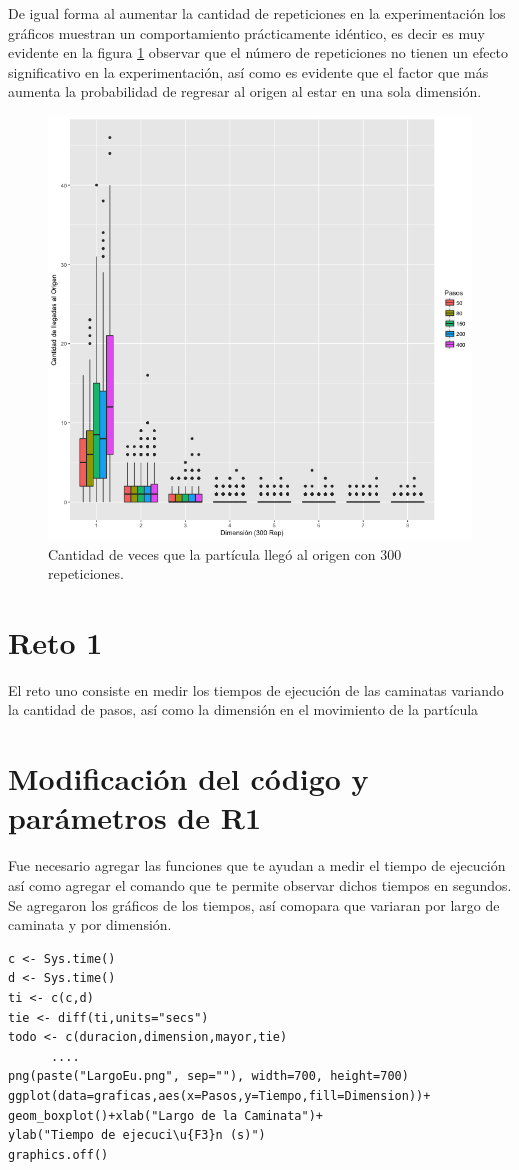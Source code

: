 \documentclass[a4paper]{article}
\begin{document}
De igual forma al aumentar la cantidad de repeticiones en la experimentación los gráficos muestran un comportamiento prácticamente idéntico, es decir es muy evidente en la figura \ref{fig:PorcentajesEu300} observar que el número de repeticiones no tienen un efecto significativo en la experimentación, así como es evidente que el factor que más aumenta la probabilidad de regresar al origen al estar en una sola dimensión.
\begin{figure}[h]
\centering
\includegraphics[width=0.7\linewidth]{PorcentajesEu300}
\caption{Cantidad de veces que la partícula llegó al origen con 300 repeticiones.}
\label{fig:PorcentajesEu300}
\end{figure}

\section{Reto 1}
El reto uno consiste en medir los tiempos de ejecución de las caminatas variando la cantidad de pasos, así como la dimensión en el movimiento de la partícula

\section{Modificación del código y parámetros de R1}
Fue necesario agregar las funciones que te ayudan a medir el tiempo de ejecución así como agregar el comando que te permite observar dichos tiempos en segundos. Se agregaron los gráficos de los tiempos, así comopara que variaran por largo de caminata y por dimensión.
\begin{lstlisting}[frame=single]
c <- Sys.time()
d <- Sys.time()
ti <- c(c,d)
tie <- diff(ti,units="secs")
todo <- c(duracion,dimension,mayor,tie)
      ....
png(paste("LargoEu.png", sep=""), width=700, height=700)
ggplot(data=graficas,aes(x=Pasos,y=Tiempo,fill=Dimension))+
geom_boxplot()+xlab("Largo de la Caminata")+
ylab("Tiempo de ejecuci\u{F3}n (s)")
graphics.off()
\end{lstlisting}
\end{document}
